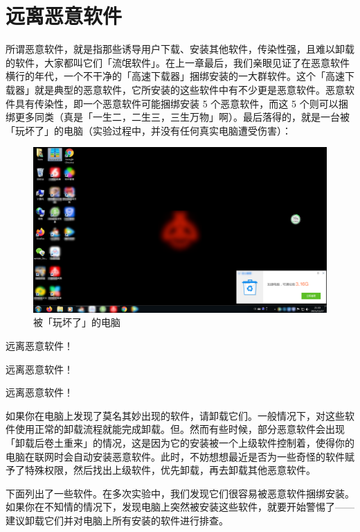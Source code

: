 \section{远离恶意软件}

所谓恶意软件，就是指那些诱导用户下载、安装其他软件，传染性强，且难以卸载的软件，大家都叫它们「流氓软件」。在上一章最后，我们亲眼见证了在恶意软件横行的年代，一个不干净的「高速下载器」捆绑安装的一大群软件。这个「高速下载器」就是典型的恶意软件，它所安装的这些软件中有不少更是恶意软件。恶意软件具有传染性，即一个恶意软件可能捆绑安装 5 个恶意软件，而这 5 个则可以捆绑更多同类（真是「一生二，二生三，三生万物」啊）。最后落得的，就是一台被「玩坏了」的电脑（实验过程中，并没有任何真实电脑遭受伤害）：

\begin{figure}[htb!]
  \centering
  \includegraphics[width=.8\textwidth]{assets/basic/Computer_with_unwanted_software.png}
  \caption{被「玩坏了」的电脑}
  \label{fig:Computer_with_unwanted_software2}
\end{figure}

\begin{dangerbox}
  \centering
  远离恶意软件！\par
  \large 远离恶意软件！\par
  \LARGE 远离恶意软件！\par
\end{dangerbox}

如果你在电脑上发现了莫名其妙出现的软件，请卸载它们。一般情况下，对这些软件使用正常的卸载流程就能完成卸载。但。然而有些时候，部分恶意软件会出现「卸载后卷土重来」的情况，这是因为它的安装被一个上级软件控制着，使得你的电脑在联网时会自动安装恶意软件。此时，不妨想想最近是否为一些奇怪的软件赋予了特殊权限，然后找出上级软件，优先卸载，再去卸载其他恶意软件。

下面列出了一些软件。在多次实验中，我们发现它们很容易被恶意软件捆绑安装。如果你在不知情的情况下，发现电脑上突然被安装这些软件，就要开始警惕了——建议卸载它们并对电脑上所有安装的软件进行排查。

